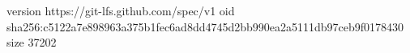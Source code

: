 version https://git-lfs.github.com/spec/v1
oid sha256:c5122a7e898963a375b1fec6ad8dd4745d2bb990ea2a5111db97ceb9f0178430
size 37202
